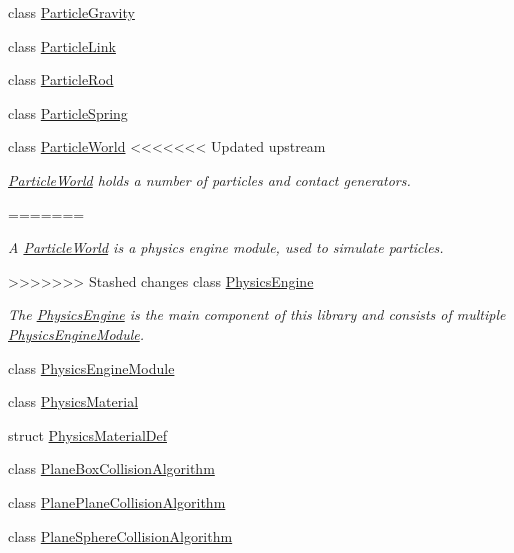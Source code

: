 \begin{DoxyCompactItemize}
\item 
class \mbox{\hyperlink{classr3_1_1_particle_gravity}{Particle\+Gravity}}
\item 
class \mbox{\hyperlink{classr3_1_1_particle_link}{Particle\+Link}}
\item 
class \mbox{\hyperlink{classr3_1_1_particle_rod}{Particle\+Rod}}
\item 
class \mbox{\hyperlink{classr3_1_1_particle_spring}{Particle\+Spring}}
\item 
class \mbox{\hyperlink{classr3_1_1_particle_world}{Particle\+World}}
<<<<<<< Updated upstream
\begin{DoxyCompactList}\small\item\em \mbox{\hyperlink{classr3_1_1_particle_world}{Particle\+World}} holds a number of particles and contact generators. \end{DoxyCompactList}\item 
=======
\begin{DoxyCompactList}\small\item\em A \mbox{\hyperlink{classr3_1_1_particle_world}{Particle\+World}} is a physics engine module, used to simulate particles. \end{DoxyCompactList}\item 
>>>>>>> Stashed changes
class \mbox{\hyperlink{classr3_1_1_physics_engine}{Physics\+Engine}}
\begin{DoxyCompactList}\small\item\em The \mbox{\hyperlink{classr3_1_1_physics_engine}{Physics\+Engine}} is the main component of this library and consists of multiple \mbox{\hyperlink{classr3_1_1_physics_engine_module}{Physics\+Engine\+Module}}. \end{DoxyCompactList}\item 
class \mbox{\hyperlink{classr3_1_1_physics_engine_module}{Physics\+Engine\+Module}}
\item 
class \mbox{\hyperlink{classr3_1_1_physics_material}{Physics\+Material}}
\item 
struct \mbox{\hyperlink{structr3_1_1_physics_material_def}{Physics\+Material\+Def}}
\item 
class \mbox{\hyperlink{classr3_1_1_plane_box_collision_algorithm}{Plane\+Box\+Collision\+Algorithm}}
\item 
class \mbox{\hyperlink{classr3_1_1_plane_plane_collision_algorithm}{Plane\+Plane\+Collision\+Algorithm}}
\item 
class \mbox{\hyperlink{classr3_1_1_plane_sphere_collision_algorithm}{Plane\+Sphere\+Collision\+Algorithm}}

\end{DoxyCompactItemize}
